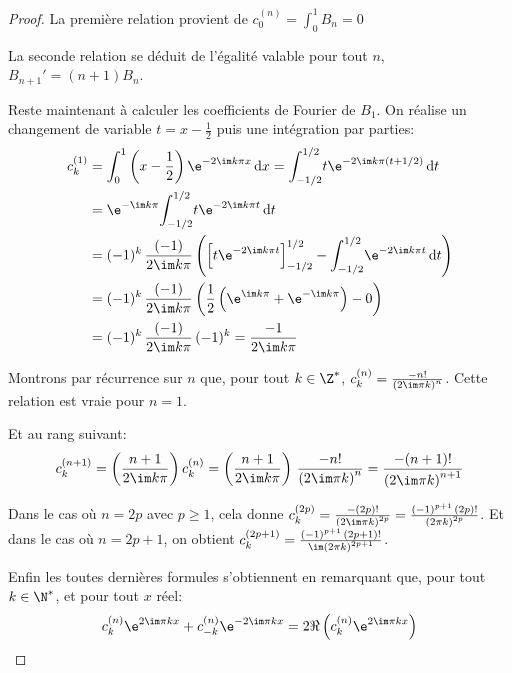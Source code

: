 \begin{proof}
La première relation provient de $c_0^{(n)} = \displaystyle{\int_0^1} B_n = 0$

\medskip
La seconde relation se déduit de l'égalité valable pour tout $n$, $B_{n+1}' = (n+1) B_n$.

\medskip
Reste maintenant à calculer les coefficients de Fourier de $B_1$. On réalise un changement de variable $t = x- \frac{1}{2}$ puis une intégration par parties:
\begin{align*}
c_k^{(1)} & = \displaystyle{\int_0^1} \left (x-\frac{1}{2}\right ) \e^{-2 \im k \pi x} \, \mathrm d x = \displaystyle{\int_{-1/2}^{1/2}} t \e^{-2 \im k \pi (t+1/2)} \, \mathrm d t \\
 & = \e^{-\im k \pi} \displaystyle{\int_{-1/2}^{1/2}} t \e^{-2 \im k \pi t} \, \mathrm d t \\
 & = (-1)^k \, \frac{(-1)}{2 \im k \pi} \left ( \left [ t \e^{-2\im k \pi t}\right ]_{-1/2}^{1/2} - \displaystyle{\int_{-1/2}^{1/2}} \e^{-2 \im k \pi t} \, \mathrm d t \right ) \\
 & = (-1)^k \, \frac{(-1)}{2 \im k \pi}  \left ( \frac{1}{2} \left ( \e^{\im k \pi} +  \e^{-\im k \pi}\right ) - 0\right ) \\
 & = (-1)^k \, \frac{(-1)}{2 \im k \pi} \, (-1)^k = \frac{-1}{2 \im k \pi}
\end{align*}

\medskip
Montrons par récurrence sur $n$ que, pour tout $k \in \Z^*$, $c_k^{(n)} = \frac{-n!}{\left ( 2 \im \pi k \right )^n}$. Cette relation est vraie pour $n = 1$. 


Et au rang suivant:
\[
c_k^{(n+1)} = \left (\frac{n+1}{2 \im k \pi}\right ) c_k^{(n)} = \left (\frac{n+1}{2 \im k \pi}\right ) \, \frac{-n!}{\left ( 2 \im \pi k \right )^n} = \frac{-(n+1)!}{\left ( 2 \im \pi k \right )^{n+1}}
\]

Dans le cas où $n = 2p$ avec $p \geq 1$, cela donne $c_k^{(2p)} = \frac{-(2p)!}{\left ( 2 \im \pi k \right )^{2p}} = \frac{(-1)^{p+1} \, (2p)!}{\left ( 2 \pi k \right )^{2p}}$. Et dans le cas où $n = 2p+1$, on obtient $c_k^{(2p+1)} = \frac{(-1)^{p+1} \, (2p+1)!}{\im \left ( 2 \pi k \right )^{2p+1}}$.

\medskip
Enfin les toutes dernières formules s'obtiennent en remarquant que, pour tout $k \in \N^*$, et pour tout $x$ réel:
\[
c_k^{(n)} \e^{2 \im \pi k x} + c_{-k}^{(n)} \e^{-2 \im \pi k x} = 2 \Re\left ( c_k^{(n)} \e^{2 \im \pi k x} \right )
\]
\end{proof}

